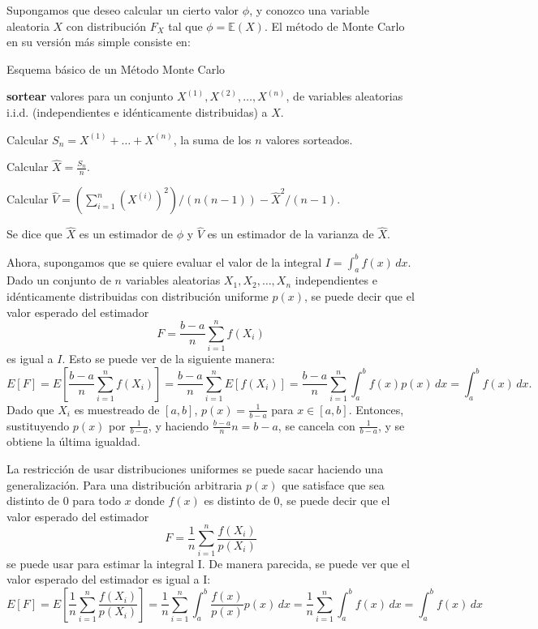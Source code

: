 \documentclass{article}
\begin{document}
Supongamos que deseo calcular un cierto valor $\phi$, y conozco una variable aleatoria $X$ con distribución $F_X$ tal que $\phi = \mathbb{E}(X)$. El método de Monte Carlo en su versión más simple consiste en:

\begin{algorithm}
\caption{Esquema básico de un Método Monte Carlo}
\begin{algorithmic}[1]

\State \textbf{sortear} valores para un conjunto $X^{(1)}, X^{(2)}, \dots, X^{(n)}$, de variables aleatorias i.i.d. (independientes e idénticamente distribuidas) a $X$.

\State Calcular $S_n = X^{(1)} + \dots + X^{(n)}$, la suma de los $n$ valores sorteados.

\State Calcular $\hat{X} = \frac{S_n}{n}$.

\State Calcular $\hat{V} = \left(\sum_{i=1}^{n} (X^{(i)})^2\right) / (n(n - 1)) - \hat{X}^2 / (n - 1)$.

\end{algorithmic}
\end{algorithm}

Se dice que $\hat{X}$ es un estimador de $\phi$ y $\hat{V}$ es un estimador de la varianza de $\hat{X}$.

Ahora, supongamos que se quiere evaluar el valor de la integral $I = \int_{a}^{b} f(x) \,dx$. Dado un conjunto de $n$ variables aleatorias $X_1, X_2, \dots, X_n$ independientes e idénticamente distribuidas con distribución uniforme $p(x)$, se puede decir que el valor esperado del estimador
$$F = \frac{b-a}{n} \sum_{i=1}^{n} f(X_i)$$
es igual a $I$. Esto se puede ver de la siguiente manera:
$$E[F] = E\left[\frac{b-a}{n} \sum_{i=1}^{n} f(X_i)\right] = \frac{b-a}{n} \sum_{i=1}^{n} E[f(X_i)] = \frac{b-a}{n} \sum_{i=1}^{n} \int_{a}^{b} f(x) p(x) \,dx = \int_{a}^{b} f(x) \,dx.$$
Dado que $X_i$ es muestreado de $[a,b]$, $p(x) = \frac{1}{b-a}$ para $x \in [a,b]$. Entonces, sustituyendo $p(x)$ por $\frac{1}{b-a}$, y haciendo $\frac{b-a}{n} n = b-a$, se cancela con $\frac{1}{b-a}$, y se obtiene la última igualdad.

La restricción de usar distribuciones uniformes se puede sacar haciendo una generalización. Para una distribución arbitraria $p(x)$ que satisface que sea distinto de 0 para todo $x$ donde $f(x)$ es distinto de 0, se puede decir que el valor esperado del estimador
$$ F = \frac{1}{n} \sum_{i=1}^{n} \frac{f(X_i)}{p(X_i)}$$
se puede usar para estimar la integral I. De manera parecida, se puede ver que el valor esperado del estimador es igual a I:
$$E[F] = E\left[\frac{1}{n} \sum_{i=1}^{n} \frac{f(X_i)}{p(X_i)}\right] = \frac{1}{n} \sum_{i=1}^{n} \int_{a}^{b} \frac{f(x)}{p(x)} p(x) \,dx = \frac{1}{n} \sum_{i=1}^{n} \int_{a}^{b} f(x) \,dx = \int_{a}^{b} f(x) \,dx$$
\end{document}
